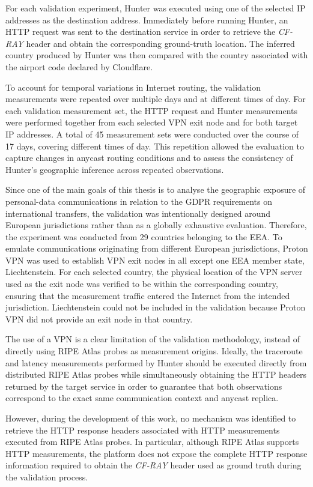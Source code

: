 For each validation experiment, Hunter was executed using one of the selected IP addresses as the destination address. Immediately before running Hunter, an HTTP request was sent to the destination service in order to retrieve the \textit{CF-RAY} header and obtain the corresponding ground-truth location. The inferred country produced by Hunter was then compared with the country associated with the airport code declared by Cloudflare.

To account for temporal variations in Internet routing, the validation measurements were repeated over multiple days and at different times of day. For each validation measurement set, the HTTP request and Hunter measurements were performed together from each selected VPN exit node and for both target IP addresses. A total of 45 measurement sets were conducted over the course of 17 days, covering different times of day. This repetition allowed the evaluation to capture changes in anycast routing conditions and to assess the consistency of Hunter's geographic inference across repeated observations.

Since one of the main goals of this thesis is to analyse the geographic exposure of personal-data communications in relation to the GDPR requirements on international transfers, the validation was intentionally designed around European jurisdictions rather than as a globally exhaustive evaluation. Therefore, the experiment was conducted from 29 countries belonging to the EEA. To emulate communications originating from different European jurisdictions, Proton VPN was used to establish VPN exit nodes in all except one EEA member state, Liechtenstein. For each selected country, the physical location of the VPN server used as the exit node was verified to be within the corresponding country, ensuring that the measurement traffic entered the Internet from the intended jurisdiction. Liechtenstein could not be included in the validation because Proton VPN did not provide an exit node in that country.

The use of a VPN is a clear limitation of the validation methodology, instead of directly using RIPE Atlas probes as measurement origins. Ideally, the traceroute and latency measurements performed by Hunter should be executed directly from distributed RIPE Atlas probes while simultaneously obtaining the HTTP headers returned by the target service in order to guarantee that both observations correspond to the exact same communication context and anycast replica.

However, during the development of this work, no mechanism was identified to retrieve the HTTP response headers associated with HTTP measurements executed from RIPE Atlas probes. In particular, although RIPE Atlas supports HTTP measurements, the platform does not expose the complete HTTP response information required to obtain the \textit{CF-RAY} header used as ground truth during the validation process.

